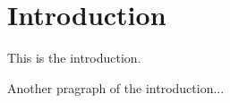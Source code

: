 \chapter{Introduction}
\mbox{}\par
This is the introduction.
\par
Another pragraph of the introduction...